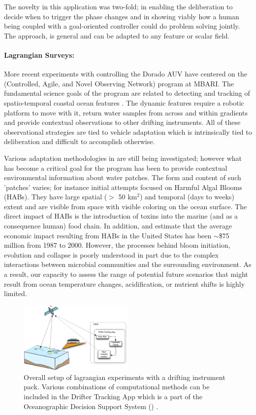 The novelty in this application was two-fold; in enabling the
deliberation to decide when to trigger the phase changes and in
showing viably how a human being coupled with a goal-oriented
controller could do problem solving jointly. The approach, is general
and can be adapted to any feature or scalar field.

\paragraph {Lagrangian Surveys:} More recent experiments with \rx
controlling the Dorado AUV have centered on the \can (Controlled,
Agile, and Novel Observing Network) program at MBARI. The fundamental
science goals of the program are related to detecting and tracking of
spatio-temporal coastal ocean features \cite{canon}. The dynamic
features require a robotic platform to move with it, return water
samples from across and within gradients and provide contextual
observations to other drifting instruments. All of these observational
strategies are tied to vehicle adaptation which is intrinsically tied
to deliberation and difficult to accomplish otherwise.

Various adaptation methodologies in \can are still being
investigated; however what has become a critical goal for the program
has been to provide contextual environmental information about water
patches. The form and content of such 'patches' varies; for instance
initial attempts focused on Harmful Algal Blooms (HABs). They have
large spatial ($>$ 50 km$^2$) and temporal (days to weeks) extent and
are visible from space with visible coloring on the ocean surface. The
direct impact of HABs is the introduction of toxins into the marine
(and as a consequence human) food chain. In addition,
\cite{anderson00} and \cite{hoagland06} estimate that the average
economic impact resulting from HABs in the United States has been
$\sim$\$75 million from 1987 to 2000. However, the processes behind
bloom initiation, evolution and collapse is poorly understood in part
due to the complex interactions between microbial communities and the
surrounding environment. As a result, our capacity to assess the range
of potential future scenarios that might result from ocean temperature
changes, acidification, or nutrient shifts is highly limited.

\begin{figure}[t]
\centering
\includegraphics[width=0.5\textwidth]{figs/dta-app.pdf}
\caption{\small{Overall setup of \can lagrangian experiments with a
    drifting instrument pack. Various combinations of computational
    methods can be included in the Drifter Tracking App which is a
    part of the Oceanographic Decision Support System (\od)
    \cite{das11}.}}
\label{fig:dta-setup}
\end{figure}

